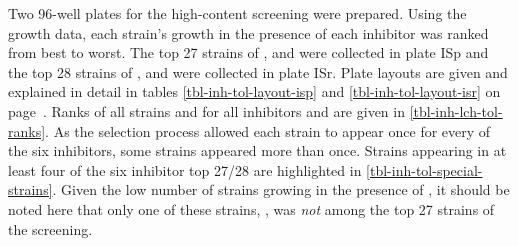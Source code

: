 Two 96-well plates for the high-content screening were prepared. Using the growth data, each strain's growth in the presence of each inhibitor was ranked from best to worst. The top 27 strains of \fur{}, \hmf{} and \van{} were collected in plate ISp and the top 28 strains of \acet{}, \fora{} and \laev{} were collected in plate ISr. Plate layouts are given and explained in detail in tables \ref{tbl-inh-tol-layout-isp} and \ref{tbl-inh-tol-layout-isr} on page~\pageref{tbl-inh-tol-layout-isp}. Ranks of all strains and for all inhibitors and \lch{} are given in \vref{tbl-inh-lch-tol-ranks}. As the selection process allowed each strain to appear once for every of the six inhibitors, some strains appeared more than once. Strains appearing in at least four of the six inhibitor top 27/28 are highlighted in \vref{tbl-inh-tol-special-strains}. Given the low number of strains growing in the presence of \van{}, it should be noted here that only one of these strains, , was \textit{not} among the top 27 strains of the \van{} screening.

